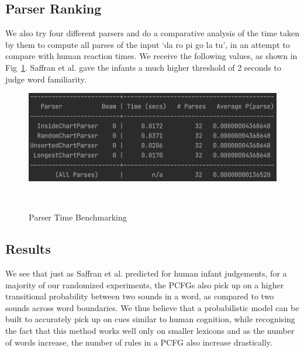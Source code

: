 \documentclass{article}
\begin{document}
\subsection{Parser Ranking}
We also try four different parsers and do a comparative analysis of the time taken by them to compute all parses of the input `da ro pi go la tu', in an attempt to compare with human reaction times. We receive the following values, as shown in Fig~\ref{fig:figure3}. Saffran et al. gave the infants a much higher threshold of 2 seconds to judge word familiarity.



\begin{figure}[h!]
  \centering
  \includegraphics[width=\columnwidth]{figures/parser_times.png}
  \caption{Parser Time Benchmarking}~\label{fig:figure3}
\end{figure}

\vspace{-3mm}
\subsection{Results}
We see that just as Saffran et al. predicted for human infant judgements, for a majority of our randomized experiments, the PCFGs also pick up on a higher transitional probability between two sounds in a word, as compared to two sounds across word boundaries. We thus believe that a probabilistic model can be built to accurately pick up on cues similar to human cognition, while recognising the fact that this method works well only on smaller lexicons and as the number of words increase, the number of rules in a PCFG also increase drastically.
\end{document}
